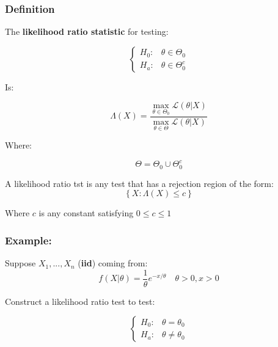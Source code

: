 \documentclass{article}
\begin{document}
\subsubsection*{Definition}

The \textbf{likelihood ratio statistic} for testing:

\begin{equation*}
    \begin{cases}
        H_0: & \theta \in \Theta_0\\
        H_a: & \theta \in \Theta_0^c
    \end{cases}
\end{equation*}

Is:

\begin{equation*}
    \Lambda(X) = \frac{\max_{\theta\in\Theta_0} \mathcal{L}(\theta|X)} {\max_{\theta\in\Theta} \mathcal{L}(\theta|X)}
\end{equation*}

Where:

\begin{equation*}
    \Theta = \Theta_0 \cup \Theta_0^c
\end{equation*}


A likelihood ratio tst is any test that has a rejection region of the form:
\begin{equation*}
    \left\{X: \Lambda(X) \leq c \right\}
\end{equation*}

Where $c$ is any constant satisfying $0\leq c \leq 1$


\subsubsection*{Example:}

Suppose $X_1,...,X_n$ (\textbf{iid}) coming from:
\begin{equation*}
    f(X|\theta) = \frac{1}{\theta} e^{-x/\theta} \quad \theta>0, x>0
\end{equation*}

Construct a likelihood ratio test to test:

\begin{equation*}
    \begin{cases}
        H_0: & \theta = \theta_0\\
        H_a: & \theta \neq \theta_0
    \end{cases}
\end{equation*}
\end{document}
